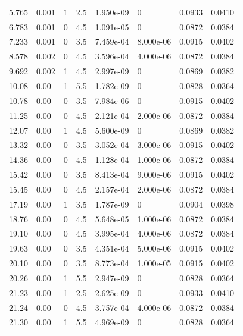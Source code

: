 \documentclass[preview]{standalone}
\begin{document}
{{\begin{tabular}{L{1.2cm}C{1.2cm} C{0.3cm}C{0.5cm} C{1.4cm}C{1.4cm} C{1.4cm}C{1.4cm}}
  5.765  &  0.001  & 1     & 2.5 &  1.950e-09  & 0  & 0.0933 &  0.0410   \\ 
  6.783  &  0.001  & 0     & 4.5 &  1.091e-05  & 0  & 0.0872 &  0.0384   \\ 
  7.233  &  0.001  & 0     & 3.5 &  7.459e-04  & 8.000e-06  & 0.0915 &  0.0402   \\ 
  8.578  &  0.002  & 0     & 4.5 &  3.596e-04  & 4.000e-06  & 0.0872 &  0.0384   \\ 
  9.692  &  0.002  & 1     & 4.5 &  2.997e-09  & 0  & 0.0869 &  0.0382   \\ 
  10.08  &  0.00  & 1     & 5.5 &  1.782e-09  & 0  & 0.0828 &  0.0364   \\ 
  10.78  &  0.00  & 0     & 3.5 &  7.984e-06  & 0  & 0.0915 &  0.0402   \\ 
  11.25  &  0.00  & 0     & 4.5 &  2.121e-04  & 2.000e-06  & 0.0872 &  0.0384   \\ 
  12.07  &  0.00  & 1     & 4.5 &  5.600e-09  & 0  & 0.0869 &  0.0382   \\ 
  13.32  &  0.00  & 0     & 3.5 &  3.052e-04  & 3.000e-06  & 0.0915 &  0.0402   \\ 
  14.36  &  0.00  & 0     & 4.5 &  1.128e-04  & 1.000e-06  & 0.0872 &  0.0384   \\ 
  15.42  &  0.00  & 0     & 3.5 &  8.413e-04  & 9.000e-06  & 0.0915 &  0.0402   \\ 
  15.45  &  0.00  & 0     & 4.5 &  2.157e-04  & 2.000e-06  & 0.0872 &  0.0384   \\ 
  17.19  &  0.00  & 1     & 3.5 &  1.787e-09  & 0  & 0.0904 &  0.0398   \\ 
  18.76  &  0.00  & 0     & 4.5 &  5.648e-05  & 1.000e-06  & 0.0872 &  0.0384   \\ 
  19.10  &  0.00  & 0     & 4.5 &  3.995e-04  & 4.000e-06  & 0.0872 &  0.0384   \\ 
  19.63  &  0.00  & 0     & 3.5 &  4.351e-04  & 5.000e-06  & 0.0915 &  0.0402   \\ 
  20.10  &  0.00  & 0     & 3.5 &  8.773e-04  & 1.000e-05  & 0.0915 &  0.0402   \\ 
  20.26  &  0.00  & 1     & 5.5 &  2.947e-09  & 0  & 0.0828 &  0.0364   \\ 
  21.23  &  0.00  & 1     & 2.5 &  2.625e-09  & 0  & 0.0933 &  0.0410   \\ 
  21.24  &  0.00  & 0     & 4.5 &  3.757e-04  & 4.000e-06  & 0.0872 &  0.0384   \\ 
  21.30  &  0.00  & 1     & 5.5 &  4.969e-09  & 0  & 0.0828 &  0.0364   \\ 

\end{tabular}}}
\end{document}
